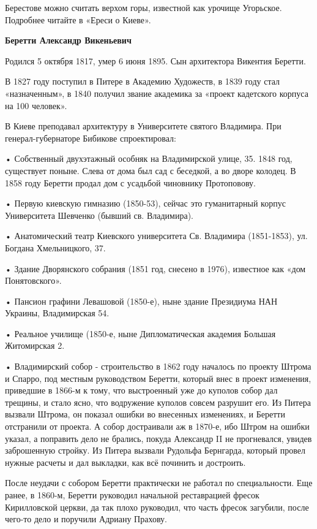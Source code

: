 Берестове можно считать верхом горы, известной как урочище Угорьское. Подробнее читайте в «Ереси о Киеве».\\

\medskip


\textbf{Беретти Александр Викеньевич}

Родился 5 октября 1817, умер 6 июня 1895. Сын архитектора Викентия Беретти.

В 1827 году поступил в Питере в Академию Художеств, в 1839 году стал «назначенным», в 1840 получил звание академика за «проект кадетского корпуса на 100 человек».

В Киеве преподавал архитектуру в Университете святого Владимира. При генерал-губер\-наторе Бибикове спроектировал:

\noindent • Собственный двухэтажный особняк на Владимирской улице, 35. 1848 год, существует поныне. Слева от дома был сад с беседкой, а во дворе колодец. В 1858 году Беретти продал дом с усадьбой чиновнику Протоповову.

\noindent • Первую киевскую гимназию (1850-53), сейчас  это гуманитарный корпус Университета Шевченко (бывший св. Владимира).

\noindent • Анатомический театр Киевского университета Св. Владимира (1851-1853), ул. Богдана Хмельницкого, 37.

\noindent • Здание Дворянского собрания (1851 год, снесено в 1976), известное как «дом Понятовского».

\noindent • Пансион графини Левашовой (1850-е), ныне здание Президиума НАН Украины, Владимирская 54.

\noindent • Реальное училище (1850-е, ныне Дипломатическая академия Большая Житомирская 2.

\noindent • Владимирский собор - строительство в 1862 году началось по проекту Штрома и Спарро, под местным руководством Беретти, который внес в проект изменения, приведшие в 1866-м к тому, что выстроенный уже до куполов собор дал трещины, и стало ясно, что водружение куполов совсем разрушит его. Из Питера вызвали Штрома, он показал ошибки во внесенных изменениях, и Беретти отстранили от проекта. А собор достраивали аж в 1870-е, ибо Штром на ошибки указал, а поправить дело не брались, покуда Александр II не прогневался, увидев заброшенную стройку. Из Питера вызвали Рудольфа Бернгарда, который провел нужные расчеты и дал выкладки, как всё починить и достроить. 

После неудачи с собором Беретти практически не работал по специальности. Еще ранее, в 1860-м, Беретти руководил начальной реставрацией фресок Кирилловской церкви, да так плохо руководил, что часть фресок загубили, после чего-то дело и поручили Адриану Прахову.

